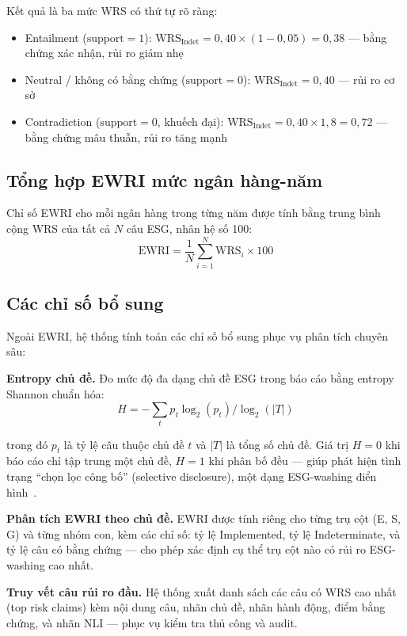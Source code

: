 Kết quả là ba mức WRS có thứ tự rõ ràng:
\begin{itemize}
    \item Entailment ($\text{support}=1$): $\text{WRS}_{\text{Indet}} = 0{,}40 \times (1 - 0{,}05) = 0{,}38$ \quad --- bằng chứng xác nhận, rủi ro giảm nhẹ
    \item Neutral / không có bằng chứng ($\text{support}=0$): $\text{WRS}_{\text{Indet}} = 0{,}40$ \quad --- rủi ro cơ sở
    \item Contradiction ($\text{support}=0$, khuếch đại): $\text{WRS}_{\text{Indet}} = 0{,}40 \times 1{,}8 = 0{,}72$ \quad --- bằng chứng mâu thuẫn, rủi ro tăng mạnh
\end{itemize}


\subsection{Tổng hợp EWRI mức ngân hàng-năm}
\label{subsec:ewri_aggregation}

Chỉ số EWRI cho mỗi ngân hàng trong từng năm được tính bằng trung bình cộng WRS của tất cả $N$ câu ESG, nhân hệ số 100:
\begin{equation}
    \text{EWRI} = \frac{1}{N} \sum_{i=1}^{N} \text{WRS}_i \times 100
    \label{eq:ewri}
\end{equation}

\subsection{Các chỉ số bổ sung}
\label{subsec:additional_metrics}

Ngoài EWRI, hệ thống tính toán các chỉ số bổ sung phục vụ phân tích chuyên sâu:

\textbf{Entropy chủ đề.} Đo mức độ đa dạng chủ đề ESG trong báo cáo bằng entropy Shannon chuẩn hóa:
\begin{equation}
    H = -\sum_{t} p_t \log_2(p_t) \Big/ \log_2(|T|)
    \label{eq:topic_entropy}
\end{equation}

\noindent trong đó $p_t$ là tỷ lệ câu thuộc chủ đề $t$ và $|T|$ là tổng số chủ đề. Giá trị $H = 0$ khi báo cáo chỉ tập trung một chủ đề, $H = 1$ khi phân bố đều --- giúp phát hiện tình trạng ``chọn lọc công bố'' (selective disclosure), một dạng ESG-washing điển hình~\cite{marquis2016scrutiny}.

\textbf{Phân tích EWRI theo chủ đề.} EWRI được tính riêng cho từng trụ cột (E, S, G) và từng nhóm con, kèm các chỉ số: tỷ lệ Implemented, tỷ lệ Indeterminate, và tỷ lệ câu có bằng chứng --- cho phép xác định cụ thể trụ cột nào có rủi ro ESG-washing cao nhất.

\textbf{Truy vết câu rủi ro đầu.} Hệ thống xuất danh sách các câu có WRS cao nhất (top risk claims) kèm nội dung câu, nhãn chủ đề, nhãn hành động, điểm bằng chứng, và nhãn NLI --- phục vụ kiểm tra thủ công và audit.